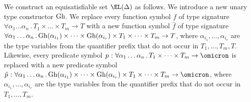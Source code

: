 We construct an equisatisfiable set $\EL(\Delta)$ as follows.
%
We introduce a new unary type constructor $\mathrm{Gh}$.
We replace every function symbol $f$ of type signature
$\forall \alpha_1\dots\alpha_n \,.\, T_1 \times \dots \times T_m \to T$
with a new function symbol $\hat{f}$ of type signature
$\forall \alpha_1\dots\alpha_n \,.\,
\mathrm{Gh}(\alpha_{i_1}) \times \dots \times \mathrm{Gh}(\alpha_{i_r}) \times
T_1 \times \dots \times T_m \to T$,
where $\alpha_{i_1},\dots,\alpha_{i_r}$ are the type
variables from the quantifier prefix that do not occur in
$T_1,\dots,T_m,T$.
Likewise, every predicate symbol $p \,\ty\,
\forall \alpha_1\dots\alpha_n \,.\, T_1 \times \dots \times T_m \to \omicron$
is replaced with a new predicate symbol $\hat{p} \,\ty\,
\forall \alpha_1\dots\alpha_n \,.\,
\ghost(\alpha_{i_1}) \times \dots \times \ghost(\alpha_{i_r}) \times
T_1 \times \dots \times T_m \to \omicron$,
where $\alpha_{i_1},\dots,\alpha_{i_r}$ are the type
variables from the quantifier prefix that do not occur in
$T_1,\dots,T_m$.


